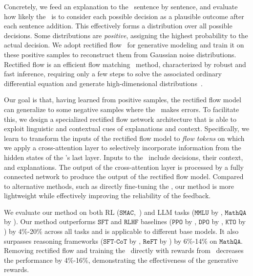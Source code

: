 Concretely, we feed an explanation to the \rlm~sentence by sentence, and evaluate how likely the \rlm~is to consider each possible decision as a plausible outcome after each sentence addition. This effectively forms a distribution over all possible decisions. Some distributions are \emph{positive}, assigning the highest probability to the actual decision. We adopt rectified flow~\cite{liu2022flow} for generative modeling and train it on these positive samples to reconstruct them from Gaussian noise distributions. Rectified flow is an efficient flow matching~\cite{chen2018neural,lipman2022flow} method, characterized by robust and fast inference, requiring only a few steps to solve the associated ordinary differential equation and generate high-dimensional distributions~\cite{song2019generative}.

Our goal is that, having learned from positive samples, the rectified flow model can generalize to some negative samples where the \rlm~makes errors. To facilitate this, we design a specialized rectified flow network architecture that is able to exploit linguistic and contextual cues of explanations and context. Specifically, we learn to transform the inputs of the rectified flow model to \emph{flow tokens} on which we apply a cross-attention layer to selectively incorporate information from the hidden states of the \rlm's last layer. Inputs to the \rlm~include decisions, their context, and explanations. The output of the cross-attention layer is processed by a fully connected network to produce the output of the rectified flow model. Compared to alternative methods, such as directly fine-tuning the \rlm, our method is more lightweight while effectively improving the reliability of the feedback.

We evaluate our method on both RL ($\mathtt{SMAC}$,~\citet{samvelyan2019starcraft}) and LLM tasks ($\mathtt{MMLU}$ by \citet{hendrycks2020measuring}, $\mathtt{MathQA}$ by \citet{amini2019mathqa}). Our method outperforms $\mathtt{SFT}$ and $\mathtt{RLHF}$ baselines ($\mathtt{PPO}$ by \citet{xu2024dpo}, $\mathtt{DPO}$ by \citet{rafailov2024direct}, $\mathtt{KTO}$ by \citet{ethayarajh2024kto}) by 4\%-20\% across all tasks and is applicable to different base models. It also surpasses reasoning frameworks ($\mathtt{SFT}$-$\mathtt{CoT}$ by \citet{wei2022chain}, $\mathtt{ReFT}$ by \citet{trung2024reft}) by 6\%-14\% on $\mathtt{MathQA}$. Removing rectified flow and training the \elm~directly with rewards from \rlm~decreases the performance by 4\%-16\%, demonstrating the effectiveness of the generative rewards. 

